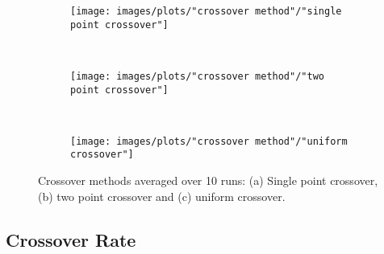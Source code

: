 \begin{figure}[h!]
    \centering
    \begin{subfigure}[b]{0.31\textwidth}
        \texttt{[image: images/plots/"crossover method"/"single point crossover"]}
        \caption{}
        \hfill
        \label{plot:single point crossover}
    \end{subfigure}
    ~
    \begin{subfigure}[b]{0.31\textwidth}
        \texttt{[image: images/plots/"crossover method"/"two point crossover"]}
        \caption{}
        \hfill
        \label{plot:two point crossover}
    \end{subfigure}
    ~
    \begin{subfigure}[b]{0.31\textwidth}
        \texttt{[image: images/plots/"crossover method"/"uniform crossover"]}
        \caption{}
        \hfill
        \label{plot:uniform crossover}
    \end{subfigure}
    \caption{Crossover methods averaged over 10 runs: (a) Single point crossover, (b) two point crossover and (c) uniform crossover.}
    \label{plot:crossover methods}
\end{figure}


\subsection{Crossover Rate}


